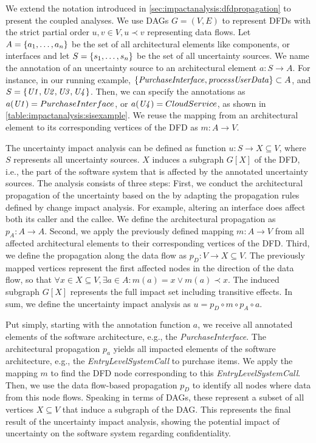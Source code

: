 We extend the notation introduced in \autoref{sec:impactanalysis:dfdpropagation} to present the coupled analyses.
We use \acp{DAG} $G = (V, E)$ to represent \acp{DFD} with the strict partial order $u, v \in V, u \prec v$ representing data flows.
Let $A = \{ a_{1},\dots,a_{n} \}$ be the set of all architectural elements like components, or interfaces and let $S = \{ s_{1},\dots,s_{n} \}$ be the set of all uncertainty sources.
We name the annotation of an uncertainty source to an architectural element $a : S \rightarrow A$.
For instance, in our running example, $\{ \mathit{PurchaseInterface}, \mathit{processUserData} \} \subset A$, and $S = \{ \mathit{U1}, \mathit{U2}, \mathit{U3}, \mathit{U4} \}$.
Then, we can specify the annotations as $a(\mathit{U1}) = PurchaseInterface$, or $a(\mathit{U4}) = CloudService$, as shown in \autoref{table:impactanalysis:sisexample}.
We reuse the mapping \cite{seifermann_architectural_2022} from an architectural element to its corresponding vertices of the \ac{DFD} as $m : A \rightarrow V$.

The uncertainty impact analysis can be defined as function $u : S \rightarrow X \subseteq V$, where $S$ represents all uncertainty sources.
$X$ induces a subgraph $G[X]$ of the \ac{DFD}, i.e., the part of the software system that is affected by the annotated uncertainty sources. 
The analysis consists of three steps:
First, we conduct the architectural propagation of the uncertainty based on the  by adapting the propagation rules defined by change impact analysis.
For example, altering an interface does affect both its caller and the callee.
We define the architectural propagation as $p_{A} : A \rightarrow A$.
Second, we apply the previously defined mapping $m : A \rightarrow V$ from all affected architectural elements to their corresponding vertices of the \ac{DFD}.
Third, we define the propagation along the data flow as $p_{D} : V \rightarrow X \subseteq V$.
The previously mapped vertices represent the first affected nodes in the direction of the data flow, so that $\forall x \in X \subseteq V, \exists a \in A : m(a) = x \vee m(a) \prec x$.
The induced subgraph $G[X]$ represents the full impact set including transitive effects.
In sum, we define the uncertainty impact analysis as $u = p_{D} \circ m \circ p_{A} \circ a$.

Put simply, starting with the annotation function $a$, we receive all annotated elements of the software architecture, e.g., the \emph{PurchaseInterface}.
The architectural propagation $p_{a}$ yields all impacted elements of the software architecture, e.g., the \emph{EntryLevelSystemCall} to purchase items.
We apply the mapping $m$ to find the \ac{DFD} node corresponding to this \emph{EntryLevelSystemCall}.
Then, we use the data flow-based propagation $p_{D}$ to identify all nodes where data from this node flows.
Speaking in terms of \acp{DAG}, these represent a subset of all vertices $X \subseteq V$ that induce a subgraph of the \ac{DAG}.
This represents the final result of the uncertainty impact analysis, showing the potential impact of uncertainty on the software system regarding confidentiality.


